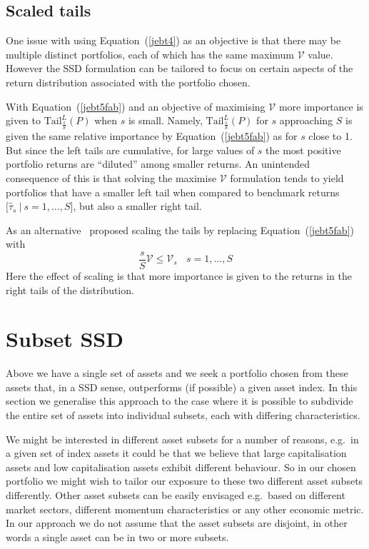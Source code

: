 \subsection{Scaled tails}
One issue with using Equation~(\ref{jebt4}) as an objective is that there may be multiple distinct portfolios, each of which has the same maximum $\mathcal{V}$ value.
However the SSD formulation can be tailored to focus on certain aspects of the return distribution associated with the portfolio chosen.


With Equation~(\ref{jebt5fab}) and an objective of maximising $\mathcal{V}$ 
more importance is given to $\text{Tail}^L_{\frac{s}{S}} (P)$ when $s$ is small. Namely, $\text{Tail}^L_{\frac{s}{S}} (P)$ for $s$ approaching $S$ is given the same relative importance by Equation~(\ref{jebt5fab}) as for $s$ close to 1. But since the left tails are cumulative, for large values of $s$ the most positive portfolio returns are \enquote{diluted} among smaller returns. An unintended consequence of this is that solving the maximise $\mathcal{V}$ formulation tends to yield portfolios that have a smaller left tail when compared to benchmark returns $[\hat{\tau}_s~|~s=1,\ldots,S$], but also a smaller right tail.

As an alternative~\cite{fabian2011b} proposed scaling the tails by replacing Equation~(\ref{jebt5fab}) with 
\begin{equation}
\frac{s}{S} \mathcal{V} \leq \mathcal{V}_s ~~~~s=1,\ldots,S
\label{fab1}
\end{equation}
Here the effect of scaling is that more importance is given to the returns in the right tails of the distribution. 




\section{Subset SSD}
\label{sec4}

Above we have a single set of assets and we seek a portfolio chosen from these assets that, in a SSD sense, outperforms (if possible) a given asset index.
In this section we generalise this approach to the case where it is possible to subdivide the entire set of assets into individual subsets, each with differing characteristics.

We might be interested in different asset subsets for a number of reasons, e.g.~in a given set of index assets it could be that we believe that
large capitalisation assets and low capitalisation assets exhibit different behaviour. So in our chosen portfolio we might wish to tailor our exposure to these two different asset subsets
differently.
Other asset subsets can be easily envisaged e.g.~based on different market sectors, different momentum characteristics or any other economic metric. In our approach we do not assume that the asset subsets are disjoint, in other words a single asset can be in  two or more subsets.

